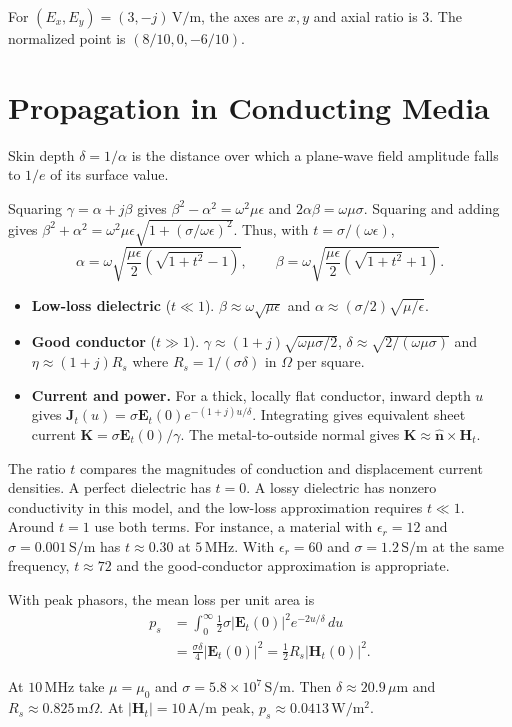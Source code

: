 \documentclass[12pt,a4paper]{article}
\begin{document}
For $(E_x,E_y)=(3,-j)\,\mathrm{V/m}$, the axes are $x,y$ and axial ratio is 3. The normalized point is $(8/10,0,-6/10)$.

\section{Propagation in Conducting Media}
\begin{tcolorbox}[defbox,title={Skin depth}]
Skin depth $\delta=1/\alpha$ is the distance over which a plane-wave field amplitude falls to $1/e$ of its surface value.
\end{tcolorbox}

Squaring $\gamma=\alpha+j\beta$ gives $\beta^2-\alpha^2=\omega^2\mu\epsilon$ and $2\alpha\beta=\omega\mu\sigma$. Squaring and adding gives $\beta^2+\alpha^2=\omega^2\mu\epsilon\sqrt{1+(\sigma/\omega\epsilon)^2}$. Thus, with $t=\sigma/(\omega\epsilon)$,
\[
\alpha=\omega\sqrt{\frac{\mu\epsilon}{2}(\sqrt{1+t^2}-1)},\qquad
\beta=\omega\sqrt{\frac{\mu\epsilon}{2}(\sqrt{1+t^2}+1)} .
\]
\begin{itemize}[leftmargin=*,itemsep=3pt]
\item \textbf{Low-loss dielectric} ($t\ll1$). $\beta\approx\omega\sqrt{\mu\epsilon}$ and $\alpha\approx(\sigma/2)\sqrt{\mu/\epsilon}$.
\item \textbf{Good conductor} ($t\gg1$). $\gamma\approx(1+j)\sqrt{\omega\mu\sigma/2}$, $\delta\approx\sqrt{2/(\omega\mu\sigma)}$ and $\eta\approx(1+j)R_s$ where $R_s=1/(\sigma\delta)$ in $\Omega$ per square.
\item \textbf{Current and power.} For a thick, locally flat conductor, inward depth $u$ gives $\mathbf J_t(u)=\sigma\mathbf E_t(0)e^{-(1+j)u/\delta}$. Integrating gives equivalent sheet current $\mathbf K=\sigma\mathbf E_t(0)/\gamma$. The metal-to-outside normal gives $\mathbf K\approx\hat{\mathbf n}\times\mathbf H_t$.
\end{itemize}
The ratio $t$ compares the magnitudes of conduction and displacement current densities. A perfect dielectric has $t=0$. A lossy dielectric has nonzero conductivity in this model, and the low-loss approximation requires $t\ll1$. Around $t=1$ use both terms. For instance, a material with $\epsilon_r=12$ and $\sigma=0.001\,\mathrm{S/m}$ has $t\approx0.30$ at $5\,\mathrm{MHz}$. With $\epsilon_r=60$ and $\sigma=1.2\,\mathrm{S/m}$ at the same frequency, $t\approx72$ and the good-conductor approximation is appropriate.

With peak phasors, the mean loss per unit area is
\[
\begin{aligned}
p_s&=\int_0^\infty \tfrac12\sigma|\mathbf E_t(0)|^2 e^{-2u/\delta}\,du\\
   &=\frac{\sigma\delta}{4}|\mathbf E_t(0)|^2
    =\tfrac12 R_s |\mathbf H_t(0)|^2 .
\end{aligned}
\]
\begin{tcolorbox}[examplebox,title={Skin depth and heating in copper}]
At $10\,\mathrm{MHz}$ take $\mu=\mu_0$ and $\sigma=5.8\times10^7\,\mathrm{S/m}$. Then $\delta\approx20.9\,\mu\mathrm m$ and $R_s\approx0.825\,\mathrm{m}\Omega$. At $|\mathbf H_t|=10\,\mathrm{A/m}$ peak, $p_s\approx0.0413\,\mathrm{W/m^2}$.
\end{tcolorbox}
\end{document}
